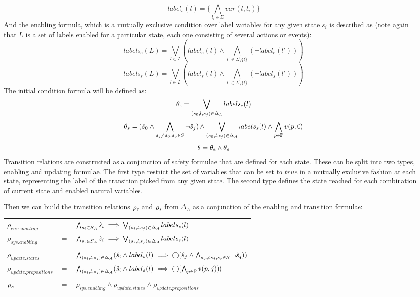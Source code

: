 \[label_s(l) = \{\bigwedge_{l_i \in \Sigma}var(l, l_i)\}\]
And the enabling formula, which is a mutually exclusive condition over label variables for any given state $s_i$ is described as (note again that $L$ is a set of labels enabled for a particular state, each one consisting of several actions or events):
\[labels_e(L) = \bigvee_{l \in L}(label_e(l) \wedge \bigwedge_{l' \in L \setminus \{l\}}(\neg label_e(l')) ) \]
\[labels_s(L) = \bigvee_{l \in L}(label_s(l) \wedge \bigwedge_{l' \in L \setminus \{l\}}(\neg label_s(l')) ) \]
The initial condition formula will be defined as:
\[{\theta_e} = \bigvee_{(s_0,l,s_j) \in \Delta_A}labels_e(l)\]
\[{\theta_s} = (\hat{s}_{0} \wedge\bigwedge_{s_j \neq s_0, s_q \in S}\neg \hat{s}_{j})  \wedge \bigvee_{(s_0,l,s_j) \in \Delta_A}labels_s(l) \wedge \bigwedge_{{p} \in {\mathbb{P}}}v({p},0)\]
\[\theta = {\theta_e} \wedge {\theta_s}\]
Transition relations are constructed as a conjunction of safety formulae that are defined for each state. These can be split into two types, enabling and updating formulae. The first type restrict the set of variables that can be set to $true$ in a mutually exclusive fashion at each state, representing the label of the transition picked from any given state. The second type defines the state reached for each combination of current state and enabled natural variables. 

Then we can build the transition relations ${\rho_e}$ and ${\rho_s}$ from $\Delta_A$ as a conjunction of the enabling and transition formulae:

\vspace{1em}
\begin{tabular}{ l c l }
	$\rho_{env.enabling}$ &$=$& $\bigwedge_{s_i \in S_A} \hat{s}_{i} \implies \bigvee_{(s_i,l,s_j) \in \Delta_A}labels_e(l)$\\
	$\rho_{sys.enabling}$ &$=$& $\bigwedge_{s_i \in S_A} \hat{s}_{i} \implies \bigvee_{(s_i,l,s_j) \in \Delta_A}labels_s(l)$\\
	&&\\
	$\rho_{update.states}$&$=$&$\bigwedge_{(s_i,l,s_j) \in \Delta_A} (\hat{s}_{i} \wedge label_s(l) \implies \bigcirc(\hat{s}_{j} \wedge\bigwedge_{s_q \neq s_j, s_q \in S}\neg \hat{s}_{q}) ) $\\
	$\rho_{update.propositions}$&$=$&$\bigwedge_{(s_i,l,s_j) \in \Delta_A} (\hat{s}_{i} \wedge label_s(l) \implies \bigcirc(\bigwedge_{{p} \in {\mathbb{P}}}v({p},j) ) )$\\
	&&\\
	${\rho_s}$&$=$&$\rho_{sys.enabling} \wedge  \rho_{update.states} \wedge  \rho_{update.propositions}$\\	
\end{tabular}
\vspace{1em}

